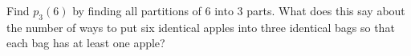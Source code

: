 \documentclass{book}
\begin{document}
\setcounter{cpjt}{208}
\addtocounter{cpjt}{-1}
\begin{activity}\label{activity-201}
\hypertarget{p-1124}{}%
Find \(p_3(6)\) by finding all partitions of 6 into 3 parts. What does this say about the number of ways to put six identical apples into three identical bags so that each bag has at least one apple?%
\par\smallskip%
\noindent\end{activity}

\clearpage
\end{document}
